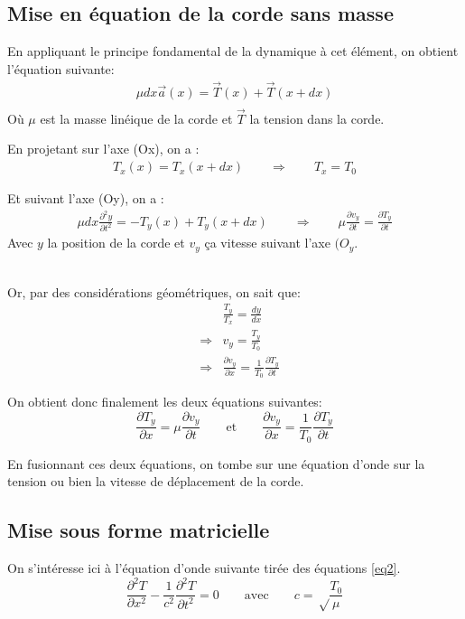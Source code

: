 \documentclass[a4paper,11pt]{report} %
\begin{document}
\subsection{Mise en équation de la corde sans masse}
En appliquant le principe fondamental de la dynamique à cet élément, on obtient l'équation suivante:
\begin{eqnarray*}
\mu dx \vec{a} (x) = \vec{T}(x) + \vec{T} (x+dx) \\
\end{eqnarray*}
Où $\mu$ est la masse linéique de la corde et $\vec{T}$ la tension dans la corde.

\indent En projetant sur l'axe (Ox), on a : 
\begin{eqnarray*}
T_x (x)= T_x (x+dx)  \qquad \Rightarrow \qquad T_x = T_0
\end{eqnarray*} 

Et suivant l'axe (Oy), on a : 
\begin{eqnarray*}
\mu dx \frac{\partial ^2 y}{\partial t^2} = -T_y (x) + T_y (x+dx)\qquad \Rightarrow \qquad \mu \frac{\partial v_y}{\partial t} = \frac{\partial T_y}{\partial t}
\end{eqnarray*}
Avec $y$ la position de la corde et $v_y$ ça vitesse suivant l'axe $(O_y$.


~\\ \indent
Or, par des considérations géométriques, on sait que:
\begin{eqnarray*}
&& \frac{T_y}{T_x} = \frac{dy}{dx} \\
& \Rightarrow & v_y = \frac{T_y}{T_0} \\
& \Rightarrow & \frac{\partial v_y}{\partial x} = \frac{1}{T_0} \frac{\partial T_y}{\partial t}
\end{eqnarray*}

On obtient donc finalement les deux équations suivantes:
\begin{equation}
\frac{\partial T_y}{\partial x} = \mu \frac{\partial v_y}{\partial t} \qquad \text{et} \qquad
\frac{\partial v_y}{\partial x} = \frac{1}{T_0} \frac{\partial T_y}{\partial t}
\label{eq2}
\end{equation}

En fusionnant ces deux équations, on tombe sur une équation d'onde sur la tension ou bien la vitesse de déplacement de la corde.

\subsection{Mise sous forme matricielle}
On s'intéresse ici à l'équation d'onde suivante tirée des équations \ref{eq2}.
\begin{equation}
\frac{\partial ^2 T}{\partial x^2} -\frac{1}{c^{2}} \frac{\partial ^2 T}{\partial t^2}= 0 \qquad \text{avec} \qquad c = \sqrt	 \frac{T_0}{\mu}
\end{equation}
\end{document}

